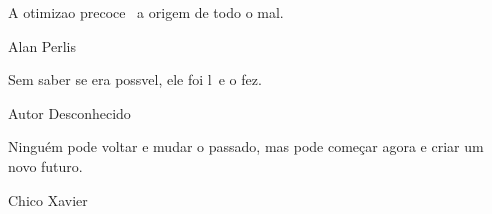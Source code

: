 
\label{tcc:epigrafe}

\null %
\vfill
\epigraph{A otimiza\ca o precoce \eh\ a origem de todo o mal.}{Alan Perlis}
\epigraph{Sem saber se era poss\ih vel, ele foi l\ah\ e o fez.}{Autor Desconhecido}
\epigraph{Ninguém pode voltar e mudar o passado, mas pode começar agora e criar um novo futuro.}{Chico Xavier}